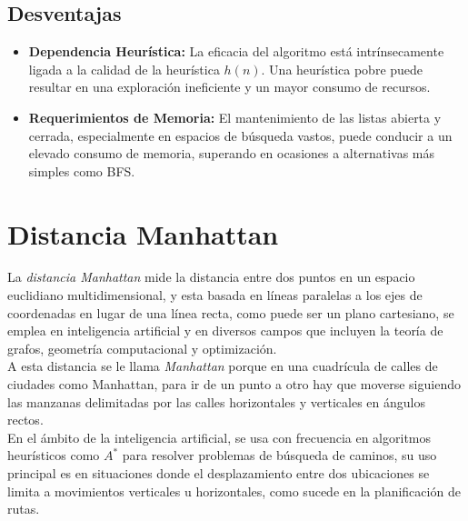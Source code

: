 \subsection*{Desventajas}
\begin{itemize}
    \item \textbf{Dependencia Heurística:} La eficacia del algoritmo está intrínsecamente ligada 
                a la calidad de la heurística \(h(n)\). Una heurística pobre puede resultar en 
                una exploración ineficiente y un mayor consumo de recursos.
    \item \textbf{Requerimientos de Memoria:} El mantenimiento de las listas abierta y cerrada,
                especialmente en espacios de búsqueda vastos, puede conducir a un elevado 
                consumo de memoria, superando en ocasiones a alternativas más simples como BFS.
\end{itemize}

\section{Distancia Manhattan}

La \textit{distancia Manhattan} mide la distancia entre dos puntos en un espacio euclidiano multidimensional, y esta basada en líneas paralelas a los ejes de coordenadas en lugar de una línea recta, como puede ser un plano cartesiano, se emplea en inteligencia artificial y  en diversos campos que incluyen la teoría de grafos, geometría computacional y optimización.\\ 

A esta distancia se le llama \textit{Manhattan} porque en una cuadrícula de calles  de ciudades como Manhattan, para ir de un punto a otro hay que moverse siguiendo las manzanas delimitadas por las calles horizontales y verticales en ángulos rectos.\\

En el ámbito de la inteligencia artificial, se usa con frecuencia en algoritmos heurísticos como $A^{*}$ para resolver problemas de búsqueda de caminos, su uso principal es en situaciones donde el desplazamiento entre dos ubicaciones se limita a movimientos verticales u horizontales, como sucede en la planificación de rutas.\\

